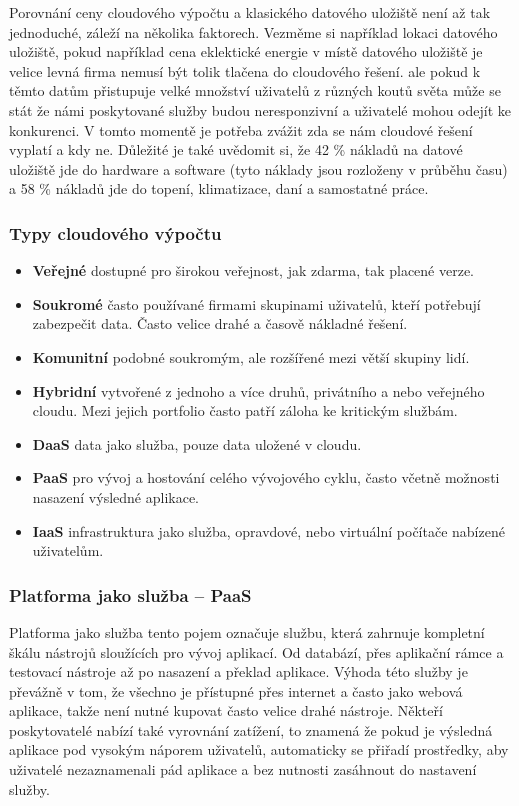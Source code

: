 \par Porovnání ceny cloudového výpočtu a klasického datového uložiště není až tak jednoduché, záleží na několika faktorech. Vezměme si například lokaci datového uložiště, pokud například cena eklektické energie v místě datového uložiště je velice levná firma nemusí být tolik tlačena do cloudového řešení. ale pokud k těmto datům přistupuje velké množství uživatelů z různých koutů světa může se stát že námi poskytované služby budou neresponzivní a uživatelé mohou odejít ke konkurenci. V tomto momentě je potřeba zvážit zda se nám cloudové řešení vyplatí a kdy ne. Důležité je také uvědomit si, že 42 \% nákladů na datové uložiště jde do hardware a software (tyto náklady jsou rozloženy v průběhu času) a 58 \% nákladů jde do topení, klimatizace, daní a samostatné práce. \cite{cloud-computing-dummies}

\subsubsection{Typy cloudového výpočtu}
\begin{itemize}
\item \textbf{Veřejné} dostupné pro širokou veřejnost, jak zdarma, tak placené verze.
\item \textbf{Soukromé} často používané firmami skupinami uživatelů, kteří potřebují zabezpečit data. Často velice drahé a časově nákladné řešení.
\item \textbf{Komunitní} podobné soukromým, ale rozšířené mezi větší skupiny lidí.
\item \textbf{Hybridní} vytvořené z jednoho a více druhů, privátního a nebo veřejného cloudu. Mezi jejich portfolio často patří záloha ke kritickým službám.
\item \textbf{DaaS} data jako služba, pouze data uložené v cloudu.
\item \textbf{PaaS} pro vývoj a hostování celého vývojového cyklu, často včetně možnosti nasazení výsledné aplikace.
\item \textbf{IaaS} infrastruktura jako služba, opravdové, nebo virtuální počítače nabízené uživatelům. \cite{cloud-computing} \label{IaaS}
\end{itemize}

\subsubsection{Platforma jako služba -- PaaS}
Platforma jako služba tento pojem označuje službu, která zahrnuje kompletní škálu nástrojů sloužících pro vývoj aplikací. Od databází, přes aplikační rámce a testovací nástroje až po nasazení a překlad aplikace. Výhoda této služby je převážně v tom, že všechno je přístupné přes internet a často jako webová aplikace, takže není nutné kupovat často velice drahé nástroje. Někteří poskytovatelé nabízí také vyrovnání zatížení, to znamená že pokud je výsledná aplikace pod vysokým náporem uživatelů, automaticky se přiřadí prostředky, aby uživatelé nezaznamenali pád aplikace a bez nutnosti zasáhnout do nastavení služby.\cite{essentials-cloud}

